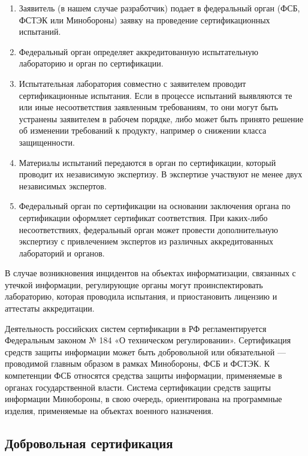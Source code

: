 \begin{enumerate}
\item Заявитель (в нашем случае разработчик) подает в федеральный орган (ФСБ, ФСТЭК или Минобороны) заявку на проведение сертификационных испытаний.
\item Федеральный орган определяет аккредитованную испытательную лабораторию и орган по сертификации.
\item Испытательная лаборатория совместно с заявителем проводит сертификационные испытания. Если в процессе испытаний выявляются те или иные несоответствия заявленным требованиям, то они могут быть устранены заявителем в рабочем порядке, либо может быть принято решение об изменении требований к продукту, например о снижении класса защищенности. 
\item  Материалы испытаний передаются в орган по сертификации, который проводит их независимую экспертизу. В экспертизе участвуют не менее двух независимых экспертов.
\item Федеральный орган по сертификации на основании заключения органа по сертификации оформляет сертификат соответствия. При каких-либо несоответствиях, федеральный орган может провести дополнительную экспертизу с привлечением экспертов из различных аккредитованных лабораторий и органов.
\end{enumerate}

В случае возникновения инцидентов на объектах информатизации, связанных с утечкой информации, регулирующие органы могут проинспектировать лабораторию, которая проводила испытания, и приостановить лицензию и аттестаты аккредитации.

Деятельность российских систем сертификации в РФ регламентируется Федеральным законом № 184 «О техническом регулировании». Сертификация средств защиты информации может быть добровольной или обязательной — проводимой главным образом в рамках Минобороны, ФСБ и ФСТЭК. К компетенции ФСБ относятся средства защиты информации, применяемые в органах государственной власти. Система сертификации средств защиты информации Минобороны, в свою очередь, ориентирована на программные изделия, применяемые на объектах военного назначения.\cite{mostest}

\subsection{Добровольная сертификация}

